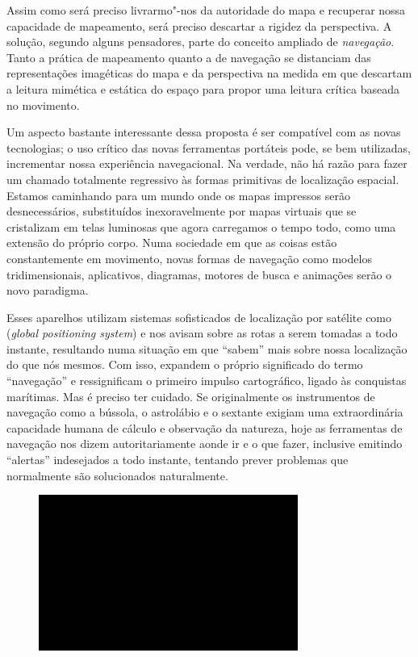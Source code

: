 Assim como será preciso livrarmo"-nos da autoridade do mapa e recuperar
nossa capacidade de mapeamento, será preciso descartar a rigidez da
perspectiva. A solução, segundo alguns pensadores, parte do conceito
ampliado de \emph{navegação}. Tanto a prática de mapeamento quanto a de
navegação se distanciam das representações imagéticas do mapa e da
perspectiva na medida em que descartam a leitura mimética e estática do
espaço para propor uma leitura crítica baseada no movimento.

Um aspecto bastante interessante dessa proposta é ser compatível com as
novas tecnologias; o uso crítico das novas ferramentas portáteis pode,
se bem utilizadas, incrementar nossa experiência navegacional. Na
verdade, não há razão para fazer um chamado totalmente regressivo às
formas primitivas de localização espacial. Estamos caminhando para um
mundo onde os mapas impressos serão desnecessários, substituídos
inexoravelmente por mapas virtuais que se cristalizam em telas luminosas
que agora carregamos o tempo todo, como uma extensão do próprio corpo.
Numa sociedade em que as coisas estão constantemente em movimento, novas
formas de navegação como modelos tridimensionais, aplicativos,
diagramas, motores de busca e animações serão o novo paradigma.

Esses aparelhos utilizam sistemas sofisticados de localização por
satélite como  (\emph{global positioning system}) e nos avisam sobre
as rotas a serem tomadas a todo instante, resultando numa situação em
que ``sabem'' mais sobre nossa localização do que nós mesmos. Com isso,
expandem o próprio significado do termo ``navegação'' e ressignificam o
primeiro impulso cartográfico, ligado às conquistas marítimas. Mas é
preciso ter cuidado. Se originalmente os instrumentos de navegação como
a bússola, o astrolábio e o sextante exigiam uma extraordinária
capacidade humana de cálculo e observação da natureza, hoje as
ferramentas de navegação nos dizem autoritariamente aonde ir e o que
fazer, inclusive emitindo ``alertas'' indesejados a todo instante,
tentando prever problemas que normalmente são solucionados naturalmente.

\begin{figure}[!ht]
\centering
 \includegraphics[width=85mm]{./imgs/im1.jpg}
\caption{\tiny{}}
\end{figure}

